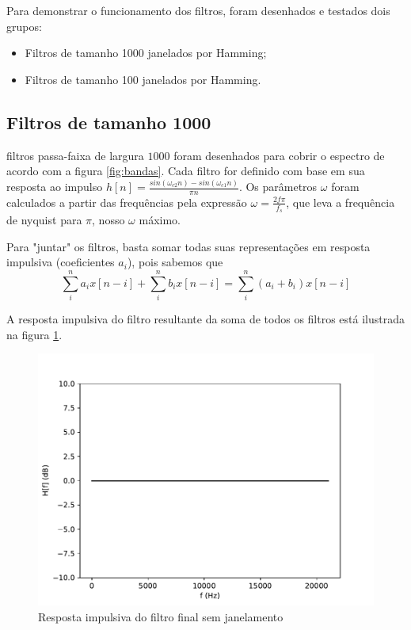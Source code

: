 
Para demonstrar o funcionamento dos filtros, foram desenhados e testados dois grupos:

\begin{itemize}
    \item Filtros de tamanho 1000 janelados por Hamming;
    \item Filtros de tamanho 100 janelados por Hamming.
\end{itemize}

\subsection{Filtros de tamanho 1000}
\label{1000}

\begin{multicols}{2}
 filtros passa-faixa de largura $1000$ foram desenhados para cobrir o espectro de acordo com a figura \ref{fig:bandas}. Cada filtro for definido com base em sua resposta ao impulso $h[n]=\frac{sin(\omega_{c2}n)-sin(\omega_{c1}n)}{\pi n}$. Os parâmetros $\omega$ foram calculados a partir das frequências pela expressão $\omega = \frac{2f\pi}{f_s}$, que leva a frequência de nyquist para $\pi$, nosso $\omega$ máximo.

Para "juntar" os filtros, basta somar todas suas representações em resposta impulsiva (coeficientes $a_i$), pois sabemos que
\[\sum\limits_i^na_ix[n-i]+\sum\limits_i^nb_ix[n-i] = \sum\limits_i^n(a_i+b_i)x[n-i]\]

A resposta impulsiva do filtro resultante da soma de todos os filtros está ilustrada na figura \ref{fig:impulsiva nowindow}.

\begin{figure}[H]
    \centering
    \includegraphics[scale=0.5]{fig/nowindow.pdf}
    \caption{Resposta impulsiva do filtro final sem janelamento}
    \label{fig:impulsiva nowindow}
\end{figure}


\end{multicols}
